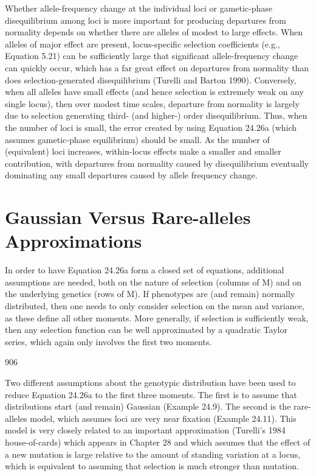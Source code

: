 \documentclass{article}
\begin{document}
Whether allele-frequency change at the individual loci or gametic-phase disequilibrium among loci is more important for producing departures from normality depends on whether there are alleles of modest to large effects. When alleles of major effect are present, locus-specific selection coefficients (e.g., Equation 5.21) can be sufficiently large that significant allele-frequency change can quickly occur, which has a far great effect on departures from normality than does selection-generated disequilibrium (Turelli and Barton 1990). Conversely, when all alleles have small effects (and hence selection is extremely weak on any single locus), then over modest time scales, departure from normality is largely due to selection generating third- (and higher-) order disequilibrium. Thus, when the number of loci is small, the error created by using Equation 24.26a (which assumes gametic-phase equilibrium) should be small. As the number of (equivalent) loci increases, within-locus effects make a smaller and smaller contribution, with departures from normality caused by disequilibrium eventually dominating any small departures caused by allele frequency change.

\section{Gaussian Versus Rare-alleles Approximations}
In order to have Equation 24.26a form a closed set of equations, additional assumptions are needed, both on the nature of selection (columns of M) and on the underlying genetics (rows of M). If phenotypes are (and remain) normally distributed, then one needs to only consider selection on the mean and variance, as these define all other moments. More generally, if selection is sufficiently weak, then any selection function can be well approximated by a quadratic Taylor series, which again only involves the first two moments.

906

Two different assumptions about the genotypic distribution have been used to reduce Equation 24.26a to the first three moments. The first is to assume that distributions start (and remain) Gaussian (Example 24.9). The second is the rare-alleles model, which assumes loci are very near fixation (Example 24.11). This model is very closely related to an important approximation (Turelli's 1984 house-of-cards) which appears in Chapter 28 and which assumes that the effect of a new mutation is large relative to the amount of standing variation at a locus, which is equivalent to assuming that selection is much stronger than mutation.
\end{document}
